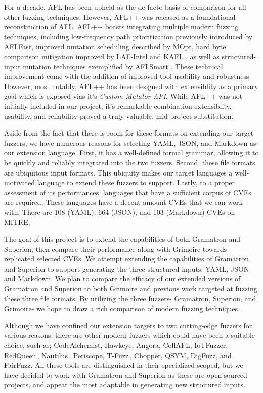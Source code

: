 \documentclass[12pt]{diazessay}
\begin{document}
For a decade, AFL has been upheld as the de-facto basis of comparison for all other fuzzing techniques.
However, AFL++\cite{fioraldi2020afl++} was released as a foundational reconstruction of AFL.
AFL++ boasts integrating multiple modern fuzzing techniques, including low-frequency path prioritization previously introduced by AFLFast\cite{bohme2017coverage}, improved mutation scheduling described by MOpt\cite{lyu2019mopt}, hard byte comparison mitigation improved by LAF-Intel \cite{intel2016circumventing} and KAFL \cite{schumilo2017kafl}, as well as structured-input mutation techniques exemplified by AFLSmart \cite{pham2019smart}.
These technical improvement come with the addition of improved tool usability and robustness.
However, most notably, AFL++ has been designed with extensiblity as a primary goal which is exposed vias it's \emph{Custom Mutator API}.
While AFL++ was not initially included in our project, it's remarkable combination extensiblity, usability, and reliability proved a truly valuable, mid-project substitution.

Aside from the fact that there is room for these formats on extending our target fuzzers, we have numerous reasons for selecting YAML, JSON, and Markdown as our extension language.
First, it has a well-defined formal grammar, allowing it to be quickly and reliably integrated into the two fuzzers.
Second, these file formats are ubiquitous input formats.
This ubiquity makes our target languages a well-motivated language to extend these fuzzers to support.
Lastly, to a proper assessment of its performances, languages that have a sufficient corpus of CVEs are required. 
These languages have a decent amount CVEs that we can work with.
There are 108 (YAML), 664 (JSON), and 103 (Markdown) CVEs on MITRE\cite{MITRE}.

The goal of this project is to extend the capabilities of both Gramatron and 
Superion, then compare their performance along with Grimoire towards replicated selected CVEs.
We attempt extending the capabilities of Gramatron and Superion to support generating the three structured inputs: YAML\cite{YAMLdraft}, JSON and Markdown.
We plan to compare the efficacy of our extended versions of Gramatron and Superion to both Grimoire and previous work targeted at fuzzing these three file formats.
By utilizing the three fuzzers- Gramatron, Superion, and Grimoire- we hope to draw a rich comparison of modern fuzzing techniques.

Although we have confined our extension targets to two cutting-edge fuzzers for various reasons, there are other modern fuzzers which could have been a suitable choice, such as; CodeAlchemist\cite{CodeAlchemist1}\cite{CodeAlchemist2}, Hawkeye\cite{Hawkeye}, Angora\cite{Angora1}\cite{Angora2}, CollAFL\cite{CollAFL}, IoTFuzzer\cite{IoTFuzzer}, RedQueen\,\cite{redqueen}, Nautilus\,\cite{Nautilus1}\cite{Nautilus2}, Periscope\cite{PeriScope1}\cite{PeriScope2}, T-Fuzz\,\cite{TFuzz1}\cite{TFuzz2}, Chopper\cite{Chopper}, QSYM\cite{QSYM1}\cite{QSYM2}, DigFuzz\cite{DigFuzz}, and FairFuzz\cite{FairFuzz1}\cite{FairFuzz2}.
All these tools are distinguished in their specialized scoped, but we have decided to work with Gramatron and Superion as these are open-sourced projects, and appear the most adaptable in generating new structured inputs.
\end{document}
